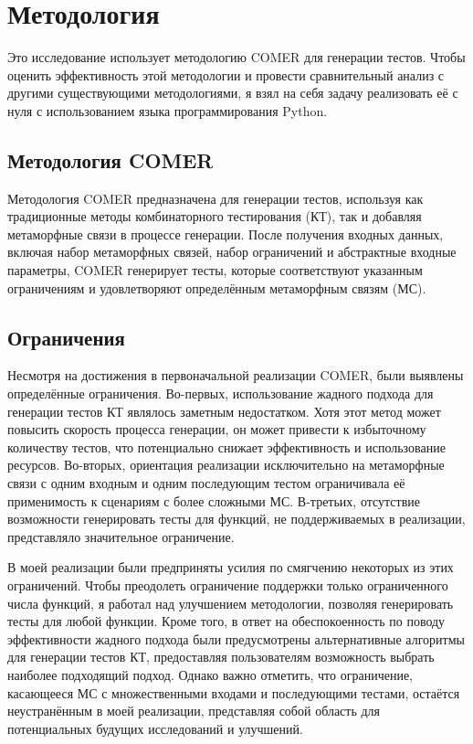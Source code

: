 \chapter{Методология}
\label{chap:met}


Это исследование использует методологию COMER для генерации тестов.
Чтобы оценить эффективность этой методологии и провести сравнительный анализ с другими существующими методологиями, я взял на себя задачу реализовать её с нуля с использованием языка программирования Python.

\section{Методология COMER}\label{sec:comer-framework}

Методология COMER предназначена для генерации тестов, используя как традиционные методы комбинаторного тестирования (КТ), так и добавляя метаморфные связи в процессе генерации.
После получения входных данных, включая набор метаморфных связей, набор ограничений и абстрактные входные параметры, COMER генерирует тесты, которые соответствуют указанным ограничениям и удовлетворяют определённым метаморфным связям (МС).

\section{Ограничения}\label{sec:limitations}

Несмотря на достижения в первоначальной реализации COMER, были выявлены определённые ограничения.
Во-первых, использование жадного подхода для генерации тестов КТ являлось заметным недостатком.
Хотя этот метод может повысить скорость процесса генерации, он может привести к избыточному количеству тестов, что потенциально снижает эффективность и использование ресурсов.
Во-вторых, ориентация реализации исключительно на метаморфные связи с одним входным и одним последующим тестом ограничивала её применимость к сценариям с более сложными МС. В-третьих, отсутствие возможности генерировать тесты для функций, не поддерживаемых в реализации, представляло значительное ограничение.

В моей реализации были предприняты усилия по смягчению некоторых из этих ограничений.
Чтобы преодолеть ограничение поддержки только ограниченного числа функций, я работал над улучшением методологии, позволяя генерировать тесты для любой функции.
Кроме того, в ответ на обеспокоенность по поводу эффективности жадного подхода были предусмотрены альтернативные алгоритмы для генерации тестов КТ, предоставляя пользователям возможность выбрать наиболее подходящий подход.
Однако важно отметить, что ограничение, касающееся МС с множественными входами и последующими тестами, остаётся неустранённым в моей реализации, представляя собой область для потенциальных будущих исследований и улучшений.

